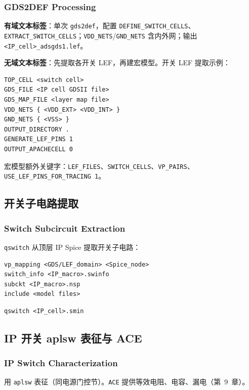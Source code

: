 \subsubsection*{GDS2DEF Processing}

\textbf{有域文本标签}：单次 \texttt{gds2def}，配置 \texttt{DEFINE\_SWITCH\_CELLS}、\texttt{EXTRACT\_SWITCH\_CELLS}；\texttt{VDD\_NETS}/\texttt{GND\_NETS} 含内外网；输出 \texttt{<IP\_cell>\_adsgds1.lef}。

\textbf{无域文本标签}：先提取各开关 LEF，再建宏模型。开关 LEF 提取示例：
\begin{lstlisting}
TOP_CELL <switch cell>
GDS_FILE <IP cell GDSII file>
GDS_MAP_FILE <layer map file>
VDD_NETS { <VDD_EXT> <VDD_INT> }
GND_NETS { <VSS> }
OUTPUT_DIRECTORY .
GENERATE_LEF_PINS 1
OUTPUT_APACHECELL 0
\end{lstlisting}

宏模型额外关键字：\texttt{LEF\_FILES}、\texttt{SWITCH\_CELLS}、\texttt{VP\_PAIRS}、\texttt{USE\_LEF\_PINS\_FOR\_TRACING 1}。



\subsection{开关子电路提取}
\subsubsection*{Switch Subcircuit Extraction}

\texttt{qswitch} 从顶层 IP Spice 提取开关子电路：
\begin{lstlisting}
vp_mapping <GDS/LEF_domain> <Spice_node>
switch_info <IP_macro>.swinfo
subckt <IP_macro>.nsp
include <model files>
\end{lstlisting}
\begin{lstlisting}
qswitch <IP_cell>.smin
\end{lstlisting}

\subsection{IP 开关 aplsw 表征与 ACE}
\subsubsection*{IP Switch Characterization}

用 \texttt{aplsw} 表征（同电源门控节）。\texttt{ACE} 提供等效电阻、电容、漏电（第~9~章）。

